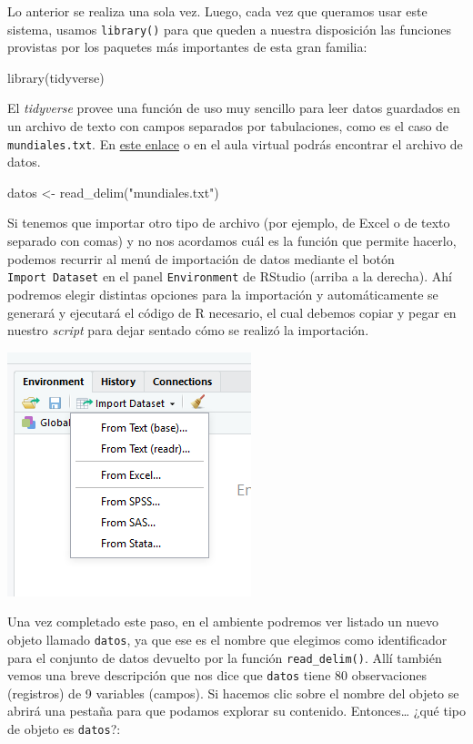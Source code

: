 \documentclass[
]{book}
\newenvironment{Shaded}{\begin{snugshade}}{\end{snugshade}}
\newcommand{\FunctionTok}[1]{\textcolor[rgb]{0.00,0.00,0.00}{#1}}
\newcommand{\NormalTok}[1]{#1}
\newcommand{\OtherTok}[1]{\textcolor[rgb]{0.56,0.35,0.01}{#1}}
\newcommand{\StringTok}[1]{\textcolor[rgb]{0.31,0.60,0.02}{#1}}
\begin{document}
Lo anterior se realiza una sola vez. Luego, cada vez que queramos usar este sistema, usamos \texttt{library()} para que queden a nuestra disposición las funciones provistas por los paquetes más importantes de esta gran familia:

\begin{Shaded}
\begin{Highlighting}[]
\FunctionTok{library}\NormalTok{(tidyverse)}
\end{Highlighting}
\end{Shaded}

El \emph{tidyverse} provee una función de uso muy sencillo para leer datos guardados en un archivo de texto con campos separados por tabulaciones, como es el caso de \texttt{mundiales.txt}. En \href{https://github.com/mpru/introprog/tree/master/archivos}{este enlace} o en el aula virtual podrás encontrar el archivo de datos.

\begin{Shaded}
\begin{Highlighting}[]
\NormalTok{datos }\OtherTok{\textless{}{-}} \FunctionTok{read\_delim}\NormalTok{(}\StringTok{"mundiales.txt"}\NormalTok{)}
\end{Highlighting}
\end{Shaded}

Si tenemos que importar otro tipo de archivo (por ejemplo, de Excel o de texto separado con comas) y no nos acordamos cuál es la función que permite hacerlo, podemos recurrir al menú de importación de datos mediante el botón \texttt{Import\ Dataset} en el panel \texttt{Environment} de RStudio (arriba a la derecha). Ahí podremos elegir distintas opciones para la importación y automáticamente se generará y ejecutará el código de R necesario, el cual debemos copiar y pegar en nuestro \emph{script} para dejar sentado cómo se realizó la importación.

\begin{center}\includegraphics[width=0.3\linewidth]{images/06_archivos/importar1} \end{center}

Una vez completado este paso, en el ambiente podremos ver listado un nuevo objeto llamado \texttt{datos}, ya que ese es el nombre que elegimos como identificador para el conjunto de datos devuelto por la función \texttt{read\_delim()}. Allí también vemos una breve descripción que nos dice que \texttt{datos} tiene 80 observaciones (registros) de 9 variables (campos). Si hacemos clic sobre el nombre del objeto se abrirá una pestaña para que podamos explorar su contenido. Entonces\ldots{} ¿qué tipo de objeto es \texttt{datos}?:
\end{document}
